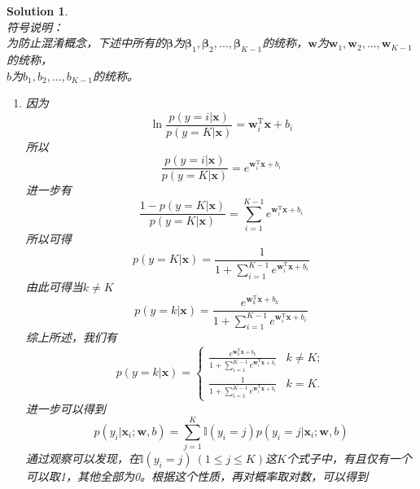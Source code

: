 \documentclass[a4paper,UTF8]{article}
\numberwithin{equation}{section}
\newtheorem*{solution}{Solution}
\begin{document}
\begin{solution}
~\\
符号说明：\\
为防止混淆概念，下述中所有的$\boldsymbol{\beta}$为$\boldsymbol{\beta}_1, \boldsymbol{\beta}_2,...,\boldsymbol{\beta}_{K-1}$的统称，$\mathbf{w}$为$\mathbf{w}_1, \mathbf{w}_2,...,\mathbf{w}_{K-1}$的统称，\\
$b$为$b_1, b_2,..., b_{K-1}$的统称。\\
\begin{enumerate}
	
\item
因为
\begin{equation}
	\ln\frac{p(y=i|\mathbf{x})}{p(y=K|\mathbf{x})}=\mathbf{w}_i^\mathrm{T}\mathbf{x}+b_i
\end{equation} 	
所以
\begin{equation}
	\frac{p(y=i|\mathbf{x})}{p(y=K|\mathbf{x})} = e^{\mathbf{w}_i^\mathrm{T}\mathbf{x}+b_i}
\end{equation}
进一步有
\begin{equation}
	\frac{1-p(y=K|\mathbf{x})}{p(y=K|\mathbf{x})} = \sum_{i=1}^{K-1}e^{\mathbf{w}_i^\mathrm{T}\mathbf{x}+b_i}
\end{equation}
所以可得
\begin{equation}
	p(y=K|\mathbf{x}) = \frac{1}{1 + \sum_{i=1}^{K-1}e^{\mathbf{w}_i^\mathrm{T}\mathbf{x}+b_i}}
\end{equation}
由此可得当$k\neq K$
\begin{equation}
	p(y=k|\mathbf{x}) = \frac{e^{\mathbf{w}_k^\mathrm{T}\mathbf{x}+b_k}}{1 + \sum_{i=1}^{K-1}e^{\mathbf{w}_i^\mathrm{T}\mathbf{x}+b_i}}
\end{equation}
综上所述，我们有
\begin{equation}
		p(y=k|\mathbf{x}) = \begin{cases}
		\frac{e^{\mathbf{w}_k^\mathrm{T}\mathbf{x}+b_k}}{1 + \sum_{i=1}^{K-1}e^{\mathbf{w}_i^\mathrm{T}\mathbf{x}+b_i}} & k\neq K;\\
		\frac{1}{1 + \sum_{i=1}^{K-1}e^{\mathbf{w}_i^\mathrm{T}\mathbf{x}+b_i}} & k = K.
		\end{cases}
\end{equation}
进一步可以得到
\begin{equation}
p(y_i|\mathbf{x}_i;\mathbf{w}, b) = \sum_{j=1}^{K}\mathbb{I}(y_i=j) p(y_i=j|\mathbf{x}_i;\mathbf{w}, b)
\end{equation}
通过观察可以发现，在$\mathbb{I}(y_i=j)\ (1 \leq j \leq K)$这$K$个式子中，有且仅有一个可以取1，其他全部为0。根据这个性质，再对概率取对数，可以得到

\end{enumerate}
\end{solution}
\end{document}
